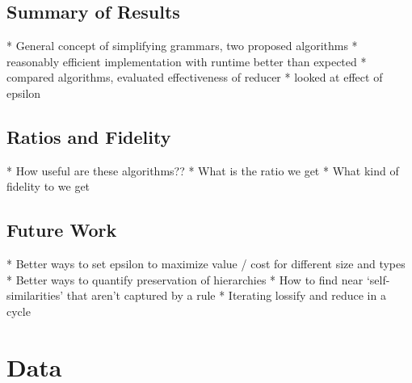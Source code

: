 \documentclass[11pt]{article}
\begin{document}
\subsection{Summary of Results}
* General concept of simplifying grammars, two proposed algorithms
* reasonably efficient implementation with runtime better than expected
* compared algorithms, evaluated effectiveness of reducer
* looked at effect of epsilon

\subsection{Ratios and Fidelity}

* How useful are these algorithms??
* What is the ratio we get
* What kind of fidelity to we get

\subsection{Future Work}
* Better ways to set epsilon to maximize value / cost for different size and types
* Better ways to quantify preservation of hierarchies
* How to find near `self-similarities' that aren't captured by a rule
* Iterating lossify and reduce in a cycle

\pagebreak

\nocite{*}



\pagebreak

\appendix

\section{Data}
\end{document}
